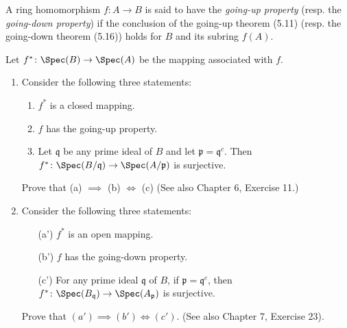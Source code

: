 \begin{exercise}
	A ring homomorphism $f \colon A \to B$ is said to have the \textit{going-up property} (resp. the \textit{going-down property}) if the conclusion of the going-up theorem (5.11) (resp. the going-down theorem (5.16)) holds for $B$ and its subring $f(A)$.

	Let $f^\ast \colon \Spec(B) \to \Spec(A)$ be the mapping associated with $f$.
	\begin{enumerate}
		\item Consider the following three statements:
		\begin{enumerate}
			\item $f^\ast$ is a closed mapping.
			\item $f$ has the going-up property.
			\item Let $\mathfrak{q}$ be any prime ideal of $B$ and let $\mathfrak{p} = \mathfrak{q}^c$. Then $f^\ast\colon \Spec(B/\mathfrak{q}) \to \Spec(A/\mathfrak{p})$ is surjective.
		\end{enumerate}
		Prove that (a) $\implies$ (b) $\iff$ (c) (See also Chapter 6, Exercise 11.)

		\item Consider the following three statements:
		\begin{enumerate}
			\item[(a')] $f^\ast$ is an open mapping.
			\item[(b')] $f$ has the going-down property.
			\item[(c')] For any prime ideal $\mathfrak{q}$ of $B$, if $\mathfrak{p} = \mathfrak{q}^c$, then $f^\ast\colon \Spec(B_\mathfrak{q}) \to \Spec(A_\mathfrak{p})$ is surjective.
		\end{enumerate}

		Prove that $(a')\implies(b')\iff(c')$. (See also Chapter 7, Exercise 23).
\end{enumerate}
\end{exercise}
